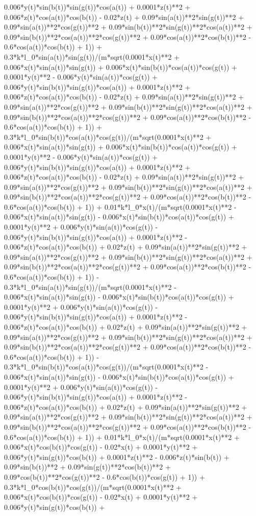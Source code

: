 0.006*y(t)*sin(b(t))*sin(g(t))*cos(a(t)) + 0.0001*z(t)**2 + 0.006*z(t)*cos(a(t))*cos(b(t)) - 0.02*z(t) + 0.09*sin(a(t))**2*sin(g(t))**2 + 0.09*sin(a(t))**2*cos(g(t))**2 + 0.09*sin(b(t))**2*sin(g(t))**2*cos(a(t))**2 + 0.09*sin(b(t))**2*cos(a(t))**2*cos(g(t))**2 + 0.09*cos(a(t))**2*cos(b(t))**2 - 0.6*cos(a(t))*cos(b(t)) + 1)) + 0.3*k*l_0*sin(a(t))*sin(g(t))/(m*sqrt(0.0001*x(t)**2 + 0.006*x(t)*sin(a(t))*sin(g(t)) + 0.006*x(t)*sin(b(t))*cos(a(t))*cos(g(t)) + 0.0001*y(t)**2 - 0.006*y(t)*sin(a(t))*cos(g(t)) + 0.006*y(t)*sin(b(t))*sin(g(t))*cos(a(t)) + 0.0001*z(t)**2 + 0.006*z(t)*cos(a(t))*cos(b(t)) - 0.02*z(t) + 0.09*sin(a(t))**2*sin(g(t))**2 + 0.09*sin(a(t))**2*cos(g(t))**2 + 0.09*sin(b(t))**2*sin(g(t))**2*cos(a(t))**2 + 0.09*sin(b(t))**2*cos(a(t))**2*cos(g(t))**2 + 0.09*cos(a(t))**2*cos(b(t))**2 - 0.6*cos(a(t))*cos(b(t)) + 1)) + 0.3*k*l_0*sin(b(t))*cos(a(t))*cos(g(t))/(m*sqrt(0.0001*x(t)**2 + 0.006*x(t)*sin(a(t))*sin(g(t)) + 0.006*x(t)*sin(b(t))*cos(a(t))*cos(g(t)) + 0.0001*y(t)**2 - 0.006*y(t)*sin(a(t))*cos(g(t)) + 0.006*y(t)*sin(b(t))*sin(g(t))*cos(a(t)) + 0.0001*z(t)**2 + 0.006*z(t)*cos(a(t))*cos(b(t)) - 0.02*z(t) + 0.09*sin(a(t))**2*sin(g(t))**2 + 0.09*sin(a(t))**2*cos(g(t))**2 + 0.09*sin(b(t))**2*sin(g(t))**2*cos(a(t))**2 + 0.09*sin(b(t))**2*cos(a(t))**2*cos(g(t))**2 + 0.09*cos(a(t))**2*cos(b(t))**2 - 0.6*cos(a(t))*cos(b(t)) + 1)) + 0.01*k*l_0*x(t)/(m*sqrt(0.0001*x(t)**2 - 0.006*x(t)*sin(a(t))*sin(g(t)) - 0.006*x(t)*sin(b(t))*cos(a(t))*cos(g(t)) + 0.0001*y(t)**2 + 0.006*y(t)*sin(a(t))*cos(g(t)) - 0.006*y(t)*sin(b(t))*sin(g(t))*cos(a(t)) + 0.0001*z(t)**2 - 0.006*z(t)*cos(a(t))*cos(b(t)) + 0.02*z(t) + 0.09*sin(a(t))**2*sin(g(t))**2 + 0.09*sin(a(t))**2*cos(g(t))**2 + 0.09*sin(b(t))**2*sin(g(t))**2*cos(a(t))**2 + 0.09*sin(b(t))**2*cos(a(t))**2*cos(g(t))**2 + 0.09*cos(a(t))**2*cos(b(t))**2 - 0.6*cos(a(t))*cos(b(t)) + 1)) - 0.3*k*l_0*sin(a(t))*sin(g(t))/(m*sqrt(0.0001*x(t)**2 - 0.006*x(t)*sin(a(t))*sin(g(t)) - 0.006*x(t)*sin(b(t))*cos(a(t))*cos(g(t)) + 0.0001*y(t)**2 + 0.006*y(t)*sin(a(t))*cos(g(t)) - 0.006*y(t)*sin(b(t))*sin(g(t))*cos(a(t)) + 0.0001*z(t)**2 - 0.006*z(t)*cos(a(t))*cos(b(t)) + 0.02*z(t) + 0.09*sin(a(t))**2*sin(g(t))**2 + 0.09*sin(a(t))**2*cos(g(t))**2 + 0.09*sin(b(t))**2*sin(g(t))**2*cos(a(t))**2 + 0.09*sin(b(t))**2*cos(a(t))**2*cos(g(t))**2 + 0.09*cos(a(t))**2*cos(b(t))**2 - 0.6*cos(a(t))*cos(b(t)) + 1)) - 0.3*k*l_0*sin(b(t))*cos(a(t))*cos(g(t))/(m*sqrt(0.0001*x(t)**2 - 0.006*x(t)*sin(a(t))*sin(g(t)) - 0.006*x(t)*sin(b(t))*cos(a(t))*cos(g(t)) + 0.0001*y(t)**2 + 0.006*y(t)*sin(a(t))*cos(g(t)) - 0.006*y(t)*sin(b(t))*sin(g(t))*cos(a(t)) + 0.0001*z(t)**2 - 0.006*z(t)*cos(a(t))*cos(b(t)) + 0.02*z(t) + 0.09*sin(a(t))**2*sin(g(t))**2 + 0.09*sin(a(t))**2*cos(g(t))**2 + 0.09*sin(b(t))**2*sin(g(t))**2*cos(a(t))**2 + 0.09*sin(b(t))**2*cos(a(t))**2*cos(g(t))**2 + 0.09*cos(a(t))**2*cos(b(t))**2 - 0.6*cos(a(t))*cos(b(t)) + 1)) + 0.01*k*l_0*x(t)/(m*sqrt(0.0001*x(t)**2 + 0.006*x(t)*cos(b(t))*cos(g(t)) - 0.02*x(t) + 0.0001*y(t)**2 + 0.006*y(t)*sin(g(t))*cos(b(t)) + 0.0001*z(t)**2 - 0.006*z(t)*sin(b(t)) + 0.09*sin(b(t))**2 + 0.09*sin(g(t))**2*cos(b(t))**2 + 0.09*cos(b(t))**2*cos(g(t))**2 - 0.6*cos(b(t))*cos(g(t)) + 1)) + 0.3*k*l_0*cos(b(t))*cos(g(t))/(m*sqrt(0.0001*x(t)**2 + 0.006*x(t)*cos(b(t))*cos(g(t)) - 0.02*x(t) + 0.0001*y(t)**2 + 0.006*y(t)*sin(g(t))*cos(b(t)) + 